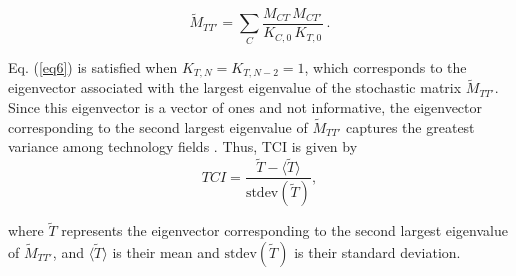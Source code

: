 \begin{equation} \label{eq7}
\widetilde{M}_{TT'} = \sum_{C} \frac{M_{CT}\, M_{CT'}}{K_{C,0}\, K_{T,0}}~.
\end{equation}

Eq. (\ref{eq6}) is satisfied when  \(K_{T,N} = K_{T,N-2} = 1\), which corresponds to the eigenvector associated with the largest eigenvalue of the stochastic matrix \(\widetilde{M}_{TT'}\). 
Since this eigenvector is a vector of ones and not informative, the eigenvector corresponding to the second largest eigenvalue of \(\widetilde{M}_{TT'}\) captures the greatest variance among technology fields \cite{Hidalgo2021, Mealy2019}.
Thus, TCI is given by
\begin{equation} \label{eq8}
TCI = \frac{\widetilde{T} - \langle \widetilde{T} \rangle}{\text{stdev}(\widetilde{T})},
\end{equation}

where \(\widetilde{T}\) represents the eigenvector corresponding to the second largest eigenvalue of \(\widetilde{M}_{TT'}\), and \(\langle \widetilde{T} \rangle\) is their mean and \(\text{stdev}(\widetilde{T})\) is their standard deviation.
